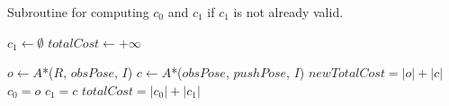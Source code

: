 \begin{algorithm}[H]

  \caption{Subroutine for computing $c_{0}$ and $c_{1}$ if $c_{1}$ is not already valid.}

  \label{alg:04-custom-observation-simple-compute01c1}

  \begin{algorithmic}[1]

      \State $c_{1} \gets \emptyset$
      \State $totalCost \gets +\infty$

        \State $o \gets A$*($R$, $obsPose$, $I$)
        \State $c \gets A$*($obsPose$, $pushPose$, $I$)
        \State $newTotalCost = |o| + |c|$
          \State $c_{0} = o$
          \State $c_{1} = c$
          \State $totalCost = |c_{0}| + |c_{1}|$
        \EndIf
      \EndFor
    \EndProcedure

  \end{algorithmic}
\end{algorithm}
